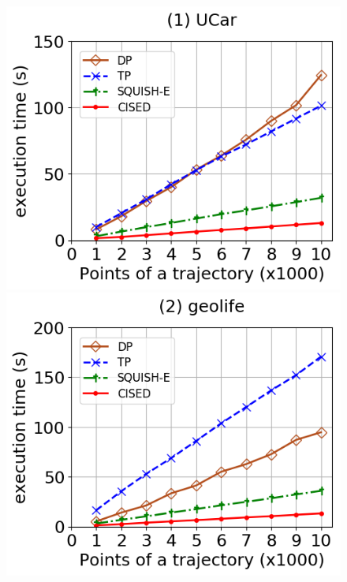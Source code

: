 \begin{figure}[tb!]
	\centering
	\includegraphics[scale=0.315]{Figures/Exp-SED-time-size-service.png}	\hspace{1ex}
	\includegraphics[scale=0.315]{Figures/Exp-SED-time-size-geolife.png}	\hspace{1ex}

\end{figure}
